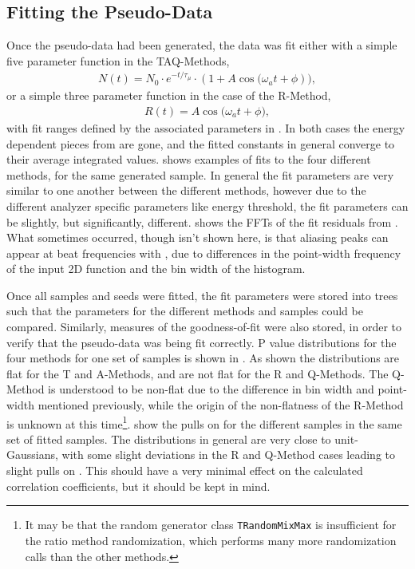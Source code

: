 \subsection{Fitting the Pseudo-Data}


Once the pseudo-data had been generated, the data was fit either with a simple five parameter function in the TAQ-Methods,
\begin{align}
    N(t) = N_{0} \cdot e^{-t/\tau_{\mu}} \cdot (1 + A \cos{(\omega_{a}t + \phi})),
\label{eq:fiveParFit}
\end{align}
or a simple three parameter function in the case of the R-Method,
\begin{align}
    R(t) =A \cos{(\omega_{a}t + \phi}),
\label{eq:ratioFit}
\end{align}
with fit ranges defined by the associated parameters in . In both cases the energy dependent pieces from  are gone, and the fitted constants in general converge to their average integrated values.  shows examples of fits to the four different methods, for the same generated sample. In general the fit parameters are very similar to one another between the different methods, however due to the different analyzer specific parameters like energy threshold, the fit parameters can be slightly, but significantly, different.  shows the FFTs of the fit residuals from . What sometimes occurred, though isn't shown here, is that aliasing peaks can appear at beat frequencies with \wa, due to differences in the point-width frequency of the input 2D function and the bin width of the histogram. 

Once all samples and seeds were fitted, the fit parameters were stored into \ROOT trees such that the parameters for the different methods and samples could be compared. Similarly, measures of the goodness-of-fit were also stored, in order to verify that the pseudo-data was being fit correctly. P value distributions for the four methods for one set of samples is shown in . As shown the distributions are flat for the T and A-Methods, and are not flat for the R and Q-Methods. The Q-Method is understood to be non-flat due to the difference in bin width and point-width mentioned previously, while the origin of the non-flatness of the R-Method is unknown at this time\footnote{It may be that the random generator class \texttt{TRandomMixMax} is insufficient for the ratio method randomization, which performs many more randomization calls than the other methods.}.  show the pulls on \R for the different samples in the same set of fitted samples. The distributions in general are very close to unit-Gaussians, with some slight deviations in the R and Q-Method cases leading to slight pulls on \R. This should have a very minimal effect on the calculated correlation coefficients, but it should be kept in mind.


